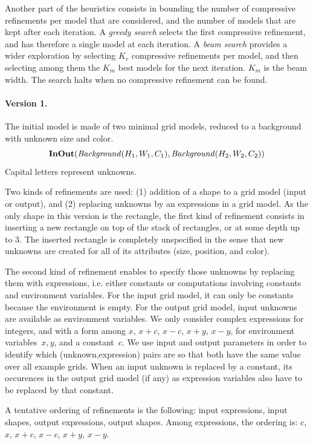 \documentclass[a4paper]{llncs}
\begin{document}
Another part of the heuristics consists in bounding the number of
compressive refinements per model that are considered, and the number
of models that are kept after each iteration. A {\em greedy search}
selects the first compressive refinement, and has therefore a single
model at each iteration. A {\em beam search} provides a wider
exploration by selecting $K_r$ compressive refinements per model, and
then selecting among them the $K_m$ best models for the next
iteration. $K_m$ is the beam width. The search halts when no
compressive refinement can be found.

\paragraph{Version 1.} The initial model is made of two minimal grid
models, reduced to a background with unknown size and color.
\[ {\bf InOut}({\it Background}(H_1,W_1,C_1), {\it
    Background}(H_2,W_2,C_2)) \] Capital letters represent unknowns.

Two kinds of refinements are used: (1) addition
of a shape to a grid model (input or output), and (2) replacing
unknowns by an expressions in a grid model. As the only shape in this
version is the rectangle, the first kind of refinement consists in
inserting a new rectangle on top of the stack of rectangles, or at
some depth up to 3. The inserted rectangle is completely unspecified
in the sense that new unknowns are created for all of its attributes
(size, position, and color).

The second kind of refinement enables to specify those unknowns by
replacing them with expressions, i.e. either constants or computations
involving constants and environment variables. For the input grid
model, it can only be constants because the environment is empty. For
the output grid model, input unknowns are available as environment
variables. We only consider complex expressions for integers, and with
a form among $x$, $x+c$, $x-c$, $x+y$, $x-y$, for environment
variables~$x,y$, and a constant~$c$. We use input and output
parameters in order to identify which (unknown,expression) pairs are
so that both have the same value over all example grids. When an input
unknown is replaced by a constant, its occurences in the output grid
model (if any) as expression variables also have to be replaced by
that constant.

A tentative ordering of refinements is the following: input
expressions, input shapes, output expressions, output shapes. Among
expressions, the ordering is: $c$, $x$, $x+c$, $x-c$, $x+y$, $x-y$.
\end{document}
